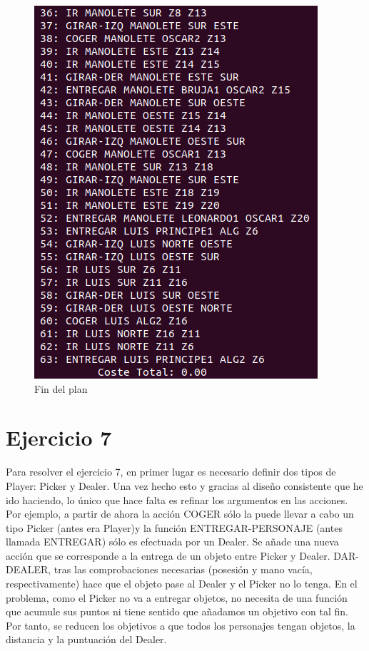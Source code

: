 \begin{figure}[H]
\begin{minipage}[b]{0.5\linewidth}
		\includegraphics[width=\linewidth]{ej6-2.png}
		\caption{Fin del plan}
		\label{fig:ej6-2}
	\end{minipage}
\end{figure}

\section{Ejercicio 7}

Para resolver el ejercicio 7, en primer lugar es necesario definir dos tipos de Player: Picker y Dealer. Una vez hecho esto y gracias al diseño consistente que he ido haciendo, lo único que hace falta es refinar los argumentos en las acciones. Por ejemplo, a partir de ahora la acción COGER sólo la puede llevar a cabo un tipo Picker (antes era Player)y la función ENTREGAR-PERSONAJE (antes llamada ENTREGAR) sólo es efectuada por un Dealer. Se añade una nueva acción que se corresponde a la entrega de un objeto entre Picker y Dealer. DAR-DEALER, tras las comprobaciones necesarias (posesión y mano vacía, respectivamente) hace que el objeto pase al Dealer y el Picker no lo tenga. En el problema, como el Picker no va a entregar objetos, no necesita de una función que acumule sus puntos ni tiene sentido que añadamos un objetivo con tal fin. Por tanto, se reducen los objetivos a que todos los personajes tengan objetos, la distancia y la puntuación del Dealer.

